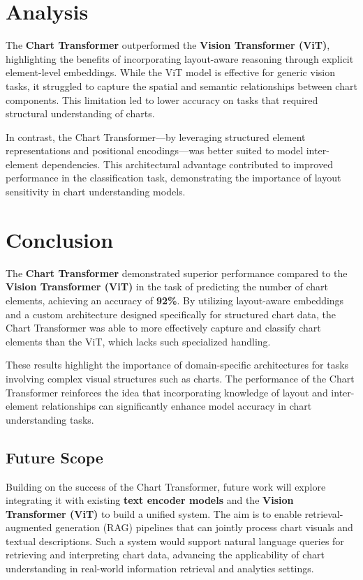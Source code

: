 \documentclass[11pt]{article}
\begin{document}
\section{Analysis} 

The \textbf{Chart Transformer} outperformed the \textbf{Vision Transformer (ViT)}, highlighting the benefits of incorporating layout-aware reasoning through explicit element-level embeddings. While the ViT model is effective for generic vision tasks, it struggled to capture the spatial and semantic relationships between chart components. This limitation led to lower accuracy on tasks that required structural understanding of charts.

In contrast, the Chart Transformer—by leveraging structured element representations and positional encodings—was better suited to model inter-element dependencies. This architectural advantage contributed to improved performance in the classification task, demonstrating the importance of layout sensitivity in chart understanding models.


\section{Conclusion} 
The \textbf{Chart Transformer} demonstrated superior performance compared to the \textbf{Vision Transformer (ViT)} in the task of predicting the number of chart elements, achieving an accuracy of \textbf{92\%}. By utilizing layout-aware embeddings and a custom architecture designed specifically for structured chart data, the Chart Transformer was able to more effectively capture and classify chart elements than the ViT, which lacks such specialized handling.

These results highlight the importance of domain-specific architectures for tasks involving complex visual structures such as charts. The performance of the Chart Transformer reinforces the idea that incorporating knowledge of layout and inter-element relationships can significantly enhance model accuracy in chart understanding tasks.

\subsection*{Future Scope}

Building on the success of the Chart Transformer, future work will explore integrating it with existing \textbf{text encoder models} and the \textbf{Vision Transformer (ViT)} to build a unified system. The aim is to enable retrieval-augmented generation (RAG) pipelines that can jointly process chart visuals and textual descriptions. Such a system would support natural language queries for retrieving and interpreting chart data, advancing the applicability of chart understanding in real-world information retrieval and analytics settings.
\end{document}
